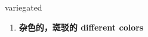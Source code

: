 
\begin{frame}
{\huge variegated}
\begin{center}
\begin{enumerate}\Large
  \item \textbf{杂色的，斑驳的 different colors}
\end{enumerate}
\end{center}
\end{frame}
